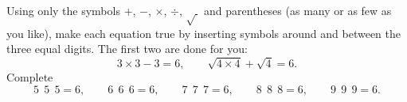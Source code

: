 Using only the symbols $+$, $-$, $\times$, $\div$, $\sqrt{\ }$ and parentheses (as many or as few as you like), make each equation true by inserting symbols around and between the three equal digits. The first two are done for you:
\[3\times3-3=6,\qquad \sqrt{4\times4}+\sqrt4=6 .\]
Complete
\[5\ \ 5\ \ 5=6,\qquad 6\ \ 6\ \ 6=6,\qquad 7\ \ 7\ \ 7=6,\qquad 8\ \ 8\ \ 8=6,\qquad 9\ \ 9\ \ 9=6 .\]
